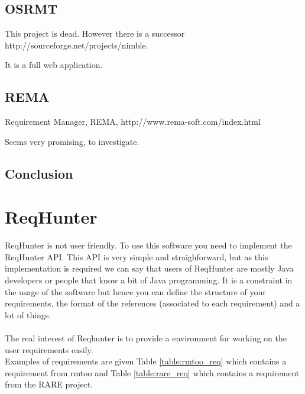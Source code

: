 \documentclass{llncs}
\begin{document}
\subsection{OSRMT}

This project is dead. However there is a successor http://sourceforge.net/projects/nimble.

It is a full web application.

\subsection{REMA}

Requirement Manager, REMA, http://www.rema-soft.com/index.html

Seems very promising, to investigate.

\subsection{Conclusion}

\section{ReqHunter}

ReqHunter is not user friendly. To use this software you need to implement the ReqHunter API. This API is very simple and straighforward, but as this implementation is required we can say that users of ReqHunter are mostly Java developers or people that know a bit of Java programming. It is a constraint in the usage of the software but hence you can define the structure of your requirements, the format of the references (associated to each requirement) and a lot of things.\\
\\
The real interest of Reqhunter is to provide a environment for working on the user requirements easily.
\\
Examples of requirements are given Table \ref{table:rmtoo_req} which contains a requirement from rmtoo and Table \ref{table:rare_req} which contains a requirement from the RARE project.
\end{document}
